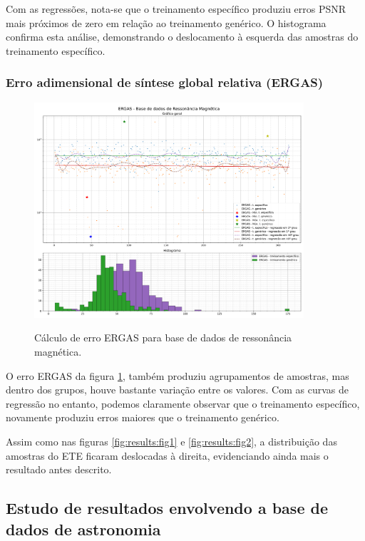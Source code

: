 Com as regressões, nota-se que o treinamento específico produziu erros PSNR mais próximos de zero em relação ao treinamento genérico. O histograma confirma esta análise, demonstrando o deslocamento à esquerda das amostras do treinamento específico.

\subsubsection{Erro adimensional de síntese global relativa (ERGAS)}
\label{sec:result:mri:ergas}

\begin{figure}[H]
    \centering
    \caption{Cálculo de erro ERGAS para base de dados de ressonância magnética.}
    \includegraphics[width=10cm]{fig/resultados/mri/png/ergas_mri_compound.png}
    \label{fig:results:fig4}
\end{figure}

O erro ERGAS da figura \ref{fig:results:fig4}, também produziu agrupamentos de amostras, mas dentro dos grupos, houve bastante variação entre os valores. Com as curvas de regressão no entanto, podemos claramente observar que o treinamento específico, novamente produziu erros maiores que o treinamento genérico. 

Assim como nas figuras \ref{fig:results:fig1} e \ref{fig:results:fig2}, a distribuição das amostras do ETE ficaram deslocadas à direita, evidenciando ainda mais o resultado antes descrito.

\subsection{Estudo de resultados envolvendo a base de dados de astronomia}
\label{sec:result:astronomy}


